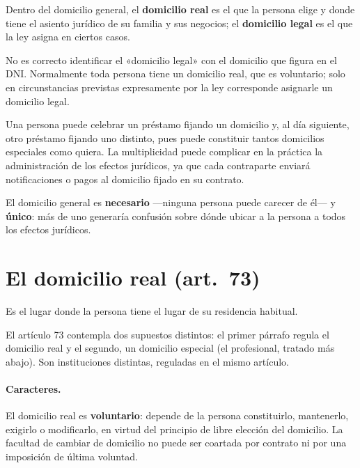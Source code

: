 \documentclass[12pt,oneside]{book}
\begin{document}
Dentro del domicilio general, el \textbf{domicilio real} es el que la persona elige y donde tiene el asiento jurídico de su familia y sus negocios; el \textbf{domicilio legal} es el que la ley asigna en ciertos casos.

\begin{advertencia}
No es correcto identificar el «domicilio legal» con el domicilio que figura en el DNI. Normalmente toda persona tiene un domicilio real, que es voluntario; solo en circunstancias previstas expresamente por la ley corresponde asignarle un domicilio legal.
\end{advertencia}

\begin{ejemplo}
Una persona puede celebrar un préstamo fijando un domicilio y, al día siguiente, otro préstamo fijando uno distinto, pues puede constituir tantos domicilios especiales como quiera. La multiplicidad puede complicar en la práctica la administración de los efectos jurídicos, ya que cada contraparte enviará notificaciones o pagos al domicilio fijado en su contrato.
\end{ejemplo}

\begin{importante}
El domicilio general es \textbf{necesario} ---ninguna persona puede carecer de él--- y \textbf{único}: más de uno generaría confusión sobre dónde ubicar a la persona a todos los efectos jurídicos.
\end{importante}

\section{El domicilio real (art.~73)}

\begin{definicion}
Es el lugar donde la persona tiene el lugar de su residencia habitual.
\end{definicion}

El artículo 73 contempla dos supuestos distintos: el primer párrafo regula el domicilio real y el segundo, un domicilio especial (el profesional, tratado más abajo). Son instituciones distintas, reguladas en el mismo artículo.

\paragraph{Caracteres.} El domicilio real es \textbf{voluntario}: depende de la persona constituirlo, mantenerlo, exigirlo o modificarlo, en virtud del principio de libre elección del domicilio. La facultad de cambiar de domicilio no puede ser coartada por contrato ni por una imposición de última voluntad.
\end{document}
